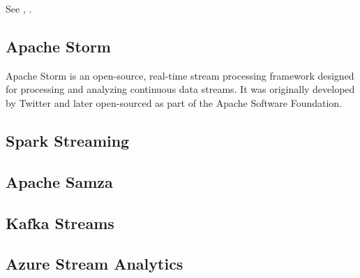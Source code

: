 \documentclass[11pt, reqno]{amsart}
\theoremstyle{definition}
\theoremstyle{remark}
\begin{document}
  See \cite{Aketal13}, \cite{Aketal15}.

  \subsection{Apache Storm}

  Apache Storm is an open-source, real-time stream processing framework designed
  for processing and analyzing continuous data streams. It was originally
  developed by Twitter and later open-sourced as part of the Apache Software
  Foundation.

  \subsection{Spark Streaming}

  \subsection{Apache Samza}

  \subsection{Kafka Streams}

  \subsection{Azure Stream Analytics}

  
  
\end{document}
